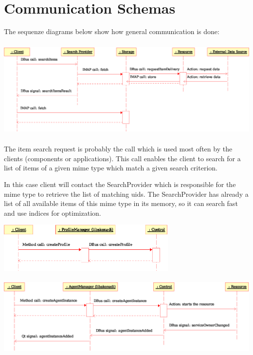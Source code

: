 \documentclass[]{report}
\begin{document}
\section{Communication Schemas}

The sequenze diagrams below show how general communication is done:

\begin{center}
\includegraphics[height=5cm]{pics/akonadi_client_search.eps}
\end{center}

The item search request is probably the call which is used most often
by the clients (components or applications). This call enables the client
to search for a list of items of a given mime type which match a
given search criterion.

In this case client will contact the SearchProvider which is responsible for
the mime type to retrieve the list of matching uids. The SearchProvider has
already a list of all available items of this mime type in its memory, so it
can search fast and use indices for optimization.

\begin{center}
\includegraphics[height=2.5cm]{pics/akonadi_profile_handling.eps}
\end{center}

\begin{center}
\includegraphics[height=4cm]{pics/akonadi_agent_handling.eps}
\end{center}
\end{document}
